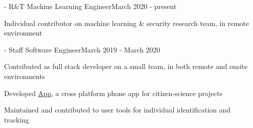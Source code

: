 \documentclass{article}
\newenvironment{**mylist}[2]{
  \subsubsection*{#1\hfill#2}
  \small
  \begin{list}{}{}
    \setlength{\topsep}{0pt}
   \setlength{\itemsep}{1pt}
   \setlength{\parskip}{0pt}
   \setlength{\parsep}{0pt}}{\end{list}\normalsize}
\newcommand{\LU}[1]{\hspace{-1em}{\bf Technologies : #1}}
\def\bsp{-.3in}
\begin{document}
\begin{comment}
\begin{**mylist}{Software :}{}
\item Git, Mercurial, SVN
\item FreeBSD, Various Linux Distributions
\item Windows XP, 7, 10
\end{**mylist}
\end{comment}

\newcommand{\BSec}[1]{
\noindent{\hspace{\bsp} \LARGE{\bf #1}{ }\hrulefill}}
\TabPositions{2.3in} %
\def\tabb{\tab- }  %

\BSec{}%

\begin{**mylist}{\href{https://www.grammatech.com}{} \tabb R\&T Machine Learning Engineer}{March 2020 - present}
\item Individual contributor on machine learning \& security research team, in remote environment
\item %
\item %
\item \LU{Python, PyTorch, C, ...}
\end{**mylist}

\begin{**mylist}{\href{www.happywhale.com}{} \tabb Staff Software Engineer}{March 2019 - March 2020}
\item Contributed as full stack developer on a small team, in both remote and onsite environments
\item Developed \href{https://play.google.com/store/apps/details?id=com.animalus.scidir&hl=en_US}{ App}, a cross platform phone app for citizen-science projects
\item Maintained and contributed to user tools for individual  identification and tracking
\item \LU{Native/TypeScript, Angular, Android, iOS, PostgreSQL, Java, Spring, firebase}
\end{**mylist}
\end{document}
